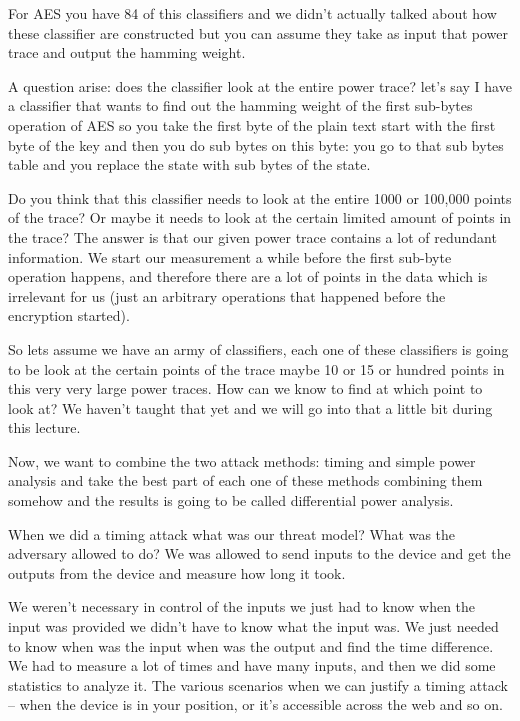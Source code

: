 
For AES you have 84 of this classifiers and we didn't actually talked about how
these classifier are constructed but you can assume they take as input that
power trace and output the hamming weight. 

A question arise: does the classifier look at the entire power trace? let's say
I have a classifier that wants to find out the hamming weight of the first
sub-bytes operation of AES so you take the first byte of the plain text start
with the first byte of the key and then you do sub bytes on this byte: you go to
that sub bytes table and you replace the state with sub bytes of the state. 

Do you think that this classifier needs to look at the entire 1000 or 100,000
points of the trace? Or maybe it needs to look at the certain limited amount of
points in the trace? The answer is that our given power trace contains a lot of
redundant information. We start our measurement a while before the first
sub-byte operation happens, and therefore there are a lot of points in the data
which is irrelevant for us (just an arbitrary operations that happened before
the encryption started).

So lets assume we have an army of classifiers, each one of these classifiers is
going to be look at the certain points of the trace maybe 10 or 15 or hundred
points in this very very large power traces. How can we know to find at which
point to look at? We haven't taught that yet and we will go into that a little
bit during this lecture. 
 
Now, we want to combine the two attack methods: timing and simple power analysis
and take the best part of each one of these methods combining them somehow and
the results is going to be called differential power analysis.
 
When we did a timing attack what was our threat model? What was the adversary
allowed to do? We was allowed to send inputs to the device and get the outputs
from the device and measure how long it took.
 
We weren't necessary in control of the inputs we just had to know when the input
was provided we didn't have to know what the input was. We just needed to know
when was the input when was the output and find the time difference. We had to
measure a lot of times and have many inputs, and then we did some statistics to
analyze it. The various scenarios when we can justify a timing attack – when the
device is in your position, or it's accessible across the web and so on.

